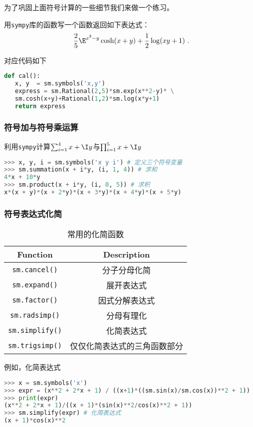 为了巩固上面符号计算的一些细节我们来做一个练习。
\begin{example}{}
用\verb|sympy|库的函数写一个函数返回如下表达式：
\begin{align}
\frac{2}{5}\E^{x^2-y}\cosh(x+y)+\frac{1}{2}\log(xy+1)~.
\end{align}


对应代码如下
\begin{lstlisting}[language=python]
def cal():
   x, y  = sm.symbols('x,y')
   express = sm.Rational(2,5)*sm.exp(x**2-y)* \
   sm.cosh(x+y)+Rational(1,2)*sm.log(x*y+1)
   return express
\end{lstlisting}
\end{example}

\subsubsection{符号加与符号乘运算}
利用\verb|sympy|计算$\sum_{i=1}^4{x+\I y}$与$\prod_{i=1}^5{x+\I y}$
\begin{lstlisting}[language=python]
>>> x, y, i = sm.symbols('x y i') # 定义三个符号变量
>>> sm.summation(x + i*y, (i, 1, 4)) # 求和
4*x + 10*y
>>> sm.product(x + i*y, (i, 0, 5)) # 求积
x*(x + y)*(x + 2*y)*(x + 3*y)*(x + 4*y)*(x + 5*y)
\end{lstlisting}

\subsubsection{符号表达式化简}
\begin{table}[ht]
\centering
\caption{常用的化简函数}\label{tab_SymPy_1}
\begin{tabular}{c|c}
Function &Description \\
\hline
\verb|sm.cancel()| &分子分母化简 \\
\hline
\verb|sm.expand()| &展开表达式\\
\hline
\verb|sm.factor()| &因式分解表达式\\
\hline
\verb|sm.radsimp()| &分母有理化\\
\hline
\verb|sm.simplify()| &化简表达式\\
\hline
\verb|sm.trigsimp()| &仅仅化简表达式的三角函数部分\\
\hline
\end{tabular}
\end{table}

例如，化简表达式
\begin{lstlisting}[language=python]
>>> x = sm.symbols('x')
>>> expr = (x**2 + 2*x + 1) / ((x+1)*((sm.sin(x)/sm.cos(x))**2 + 1))
>>> print(expr)
(x**2 + 2*x + 1)/((x + 1)*(sin(x)**2/cos(x)**2 + 1))
>>> sm.simplify(expr) # 化简表达式
(x + 1)*cos(x)**2
\end{lstlisting}

